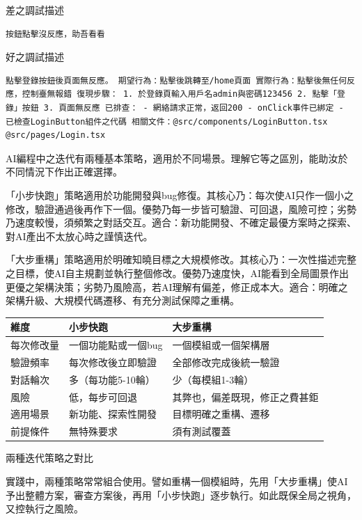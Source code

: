 差之調試描述

\begin{lstlisting}
按鈕點擊沒反應，助吾看看
\end{lstlisting}

好之調試描述

\begin{lstlisting}
點擊登錄按鈕後頁面無反應。 期望行為：點擊後跳轉至/home頁面 實際行為：點擊後無任何反應，控制臺無報錯 復現步驟： 1. 於登錄頁輸入用戶名admin與密碼123456 2. 點擊「登錄」按鈕 3. 頁面無反應 已排查： - 網絡請求正常，返回200 - onClick事件已綁定 - 已檢查LoginButton組件之代碼 相關文件：@src/components/LoginButton.tsx @src/pages/Login.tsx
\end{lstlisting}


AI編程中之迭代有兩種基本策略，適用於不同場景。理解它等之區別，能助汝於不同情況下作出正確選擇。

「小步快跑」策略適用於功能開發與bug修復。其核心乃：每次使AI只作一個小之修改，驗證通過後再作下一個。優勢乃每一步皆可驗證、可回退，風險可控；劣勢乃速度較慢，須頻繁之對話交互。適合：新功能開發、不確定最優方案時之探索、對AI產出不太放心時之謹慎迭代。

「大步重構」策略適用於明確知曉目標之大規模修改。其核心乃：一次性描述完整之目標，使AI自主規劃並執行整個修改。優勢乃速度快，AI能看到全局圖景作出更優之架構決策；劣勢乃風險高，若AI理解有偏差，修正成本大。適合：明確之架構升級、大規模代碼遷移、有充分測試保障之重構。

\begin{center}
\begin{tabularx}{\linewidth}{|X|X|X|}
\hline
\textbf{維度} & \textbf{小步快跑} & \textbf{大步重構} \tabularnewline
\hline
每次修改量 & 一個功能點或一個bug & 一個模組或一個架構層 \tabularnewline
驗證頻率 & 每次修改後立即驗證 & 全部修改完成後統一驗證 \tabularnewline
對話輪次 & 多（每功能5-10輪） & 少（每模組1-3輪） \tabularnewline
風險 & 低，每步可回退 & 其弊也，偏差既現，修正之費甚鉅 \tabularnewline
適用場景 & 新功能、探索性開發 & 目標明確之重構、遷移 \tabularnewline
前提條件 & 無特殊要求 & 須有測試覆蓋 \tabularnewline
\hline
\end{tabularx}
\end{center}

\begin{center}\small\color{gray}兩種迭代策略之對比\end{center}

實踐中，兩種策略常常組合使用。譬如重構一個模組時，先用「大步重構」使AI予出整體方案，審查方案後，再用「小步快跑」逐步執行。如此既保全局之視角，又控執行之風險。

